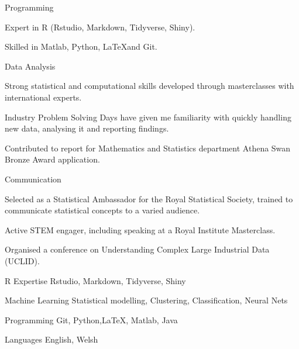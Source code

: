 \begin{cventries}
    \cventry
    {}
    {Programming}
    {}
    {}
    {
       \begin{cvitems}
        \item {Expert in R (Rstudio, Markdown, Tidyverse, Shiny).}
        \item {Skilled in Matlab, Python, \LaTeX and Git.}
        \end{cvitems}
    }
  \cventry
    {}
    {Data Analysis}
    {}
    {}
    {
      \begin{cvitems}
        \item {Strong statistical and computational skills developed through masterclasses with international experts.}
        \item {Industry Problem Solving Days have given me familiarity with quickly handling new data, analysing it and reporting findings.}
        \item {Contributed to report for Mathematics and Statistics department Athena Swan Bronze Award application.}
      \end{cvitems}
    }
    \cventry
    {}
    {Communication}
    {}
    {}
    {
      \begin{cvitems}
        \item {Selected as a Statistical Ambassador for the Royal Statistical Society, trained to communicate statistical concepts to a varied audience.}
        \item {Active STEM engager, including speaking at a Royal Institute Masterclass.}
        \item{ Organised a conference on Understanding Complex Large Industrial Data (UCLID).}
      \end{cvitems}
    }
    \end{cventries}



\begin{cvskills}
  \cvskill
    {R Expertise} %
    {Rstudio, Markdown, Tidyverse, Shiny} %

  \cvskill
    {Machine Learning} %
    {Statistical modelling, Clustering, Classification, Neural Nets} %

  \cvskill
    {Programming} %
    {Git, Python,\LaTeX, Matlab, Java} %

  \cvskill
    {Languages} %
    {English, Welsh} %

\end{cvskills}